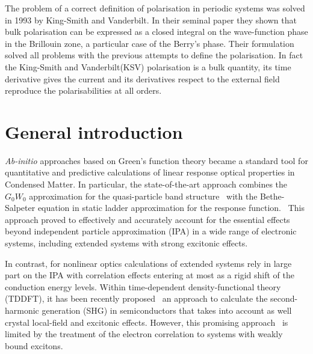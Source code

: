 The problem of a correct definition of polarisation in periodic systems was solved in 1993 by  King-Smith and Vanderbilt.\cite{KSV1} In their seminal paper they shown that  bulk polarisation can be expressed as a closed integral on the wave-function phase in the Brillouin zone, a particular case of the Berry's phase. Their formulation solved all problems with the previous attempts to define the polarisation. In fact the King-Smith and Vanderbilt(KSV) polarisation is a bulk quantity, its time derivative gives the current and its derivatives respect to the external field reproduce the polarisabilities at all orders.\\
\section{General introduction}
\emph{Ab-initio} approaches based on Green's function theory became a standard tool for quantitative and predictive calculations of linear response optical properties in Condensed Matter. In particular, the state-of-the-art approach combines the $G_0W_0$ approximation for the quasi-particle band structure~\cite{aryasetiawan1998gw} with the Bethe-Salpeter equation in static ladder approximation for the response function.~\cite{strinati} This approach proved to effectively and accurately account for the essential effects beyond independent particle approximation (IPA) in a wide range of electronic systems, including extended systems with strong excitonic effects.~\cite{Onida}

In contrast, for nonlinear optics \ai calculations of extended systems rely in large part on the IPA\cite{PhysRevB.48.11705} with correlation effects entering at most as a rigid shift of the conduction energy levels\cite{PhysRevB.80.155205}.  Within time-dependent density-functional theory (TDDFT), it has been recently proposed~\cite{PhysRevB.82.235201} an approach to calculate the second-harmonic generation (SHG) in semiconductors that takes into account as well crystal local-field and excitonic effects. However, this promising approach~\cite{Cazzanelli2012} is limited by the treatment of the electron correlation to systems with weakly bound excitons.~\cite{LRC} 

